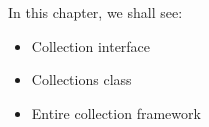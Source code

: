 \setlength{\columnsep}{3pt}
\begin{flushleft}
	
	In this chapter, we shall see:
	\begin{itemize}
		\item Collection interface
		\item Collections class
		\item Entire collection framework
	\end{itemize} 
	

\end{flushleft}


 